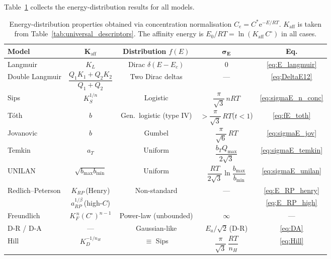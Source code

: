 	Table~\ref{tab:energy_summary} collects the energy-distribution
	results for all models.

	\begin{table}[htbp]
		\centering
		\small
		\caption{Energy-distribution properties obtained via
			concentration normalisation
			$C_e = C^{\ast}\mathrm{e}^{-E/RT}$.
			$K_{\mathrm{aff}}$ is taken from
			Table~\ref{tab:universal_descriptors}.  The affinity
			energy is
			$E_0/RT = \ln(K_{\mathrm{aff}}\,C^\circ)$ in all cases.}
		\label{tab:energy_summary}
		\renewcommand{\arraystretch}{1.35}
		\begin{tabular}{lcccc}
			\hline
			\textbf{Model}
			& $\boldsymbol{K_{\mathrm{aff}}}$
			& \textbf{Distribution $f(E)$}
			& $\boldsymbol{\sigma_E}$
			& \textbf{Eq.}
			\\
			\hline
			Langmuir
			& $K_L$
			& Dirac $\delta(E - E_c)$
			& $0$
			& \eqref{eq:E_langmuir}
			\\
			Double Langmuir
			& $\dfrac{Q_1 K_1 + Q_2 K_2}{Q_1 + Q_2}$
			& Two Dirac deltas
			& ---
			& \eqref{eq:DeltaE12}
			\\
			Sips
			& $K_S^{1/n}$
			& Logistic
			& $\dfrac{\pi}{\sqrt{3}}\,nRT$
			& \eqref{eq:sigmaE_n_conc}
			\\
			T\'oth
			& $b$
			& Gen.\ logistic (type IV)
			& $> \dfrac{\pi}{\sqrt{3}}\,RT$\;($t<1$)
			& \eqref{eq:fE_toth}
			\\
			Jovanovic
			& $b$
			& Gumbel
			& $\dfrac{\pi}{\sqrt{6}}\,RT$
			& \eqref{eq:sigmaE_jov}
			\\
			Temkin
			& $a_T$
			& Uniform
			& $\dfrac{b_T Q_{\max}}{2\sqrt{3}}$
			& \eqref{eq:sigmaE_temkin}
			\\
			UNILAN
			& $\sqrt{b_{\max}b_{\min}}$
			& Uniform
			& $\dfrac{RT}{2\sqrt{3}}
			\ln\!\dfrac{b_{\max}}{b_{\min}}$
			& \eqref{eq:sigmaE_unilan}
			\\
			Redlich--Peterson
			& $K_{RP}$\,(Henry)
			& Non-standard
			& ---
			& \eqref{eq:E_RP_henry}
			\\
			& $a_{RP}^{1/\beta}$\,(high-$C$)
			&
			&
			& \eqref{eq:E_RP_high}
			\\
			Freundlich
			& $K_F^{\,n}(C^\circ)^{n-1}$
			& Power-law (unbounded)
			& $\infty$
			& ---
			\\
			D-R / D-A
			& ---
			& Gaussian-like
			& $E_a / \sqrt{2}$\,(D-R)
			& \eqref{eq:DA}
			\\
			Hill
			& $K_D^{-1/n_H}$
			& $\equiv$ Sips
			& $\dfrac{\pi}{\sqrt{3}}\,\dfrac{RT}{n_H}$
			& \eqref{eq:Hill}
			\\
			\hline
		\end{tabular}
	\end{table}

